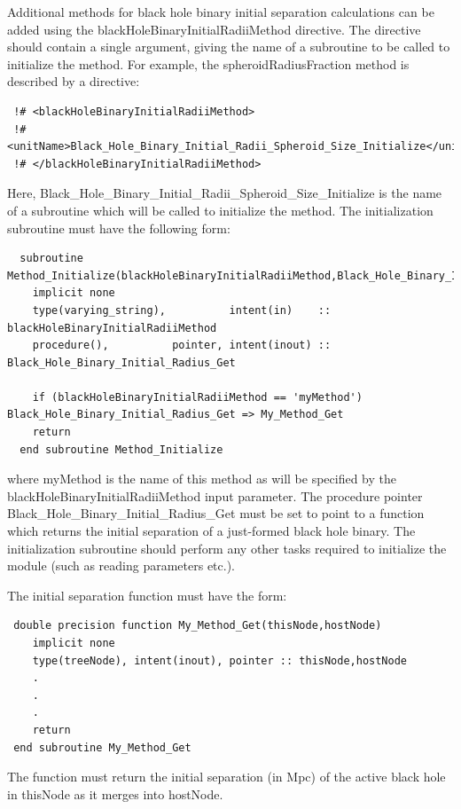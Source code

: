 Additional methods for black hole binary initial separation calculations can be added using the {\normalfont \ttfamily blackHoleBinaryInitialRadiiMethod} directive. The directive should contain a single argument, giving the name of a subroutine to be called to initialize the method. For example, the {\normalfont \ttfamily spheroidRadiusFraction} method is described by a directive:
\begin{verbatim}
 !# <blackHoleBinaryInitialRadiiMethod>
 !#  <unitName>Black_Hole_Binary_Initial_Radii_Spheroid_Size_Initialize</unitName>
 !# </blackHoleBinaryInitialRadiiMethod>
\end{verbatim}
Here, {\normalfont \ttfamily Black\_Hole\_Binary\_Initial\_Radii\_Spheroid\_Size\_Initialize} is the name of a subroutine which will be called to initialize the method. The initialization subroutine must have the following form:
\begin{verbatim}
  subroutine Method_Initialize(blackHoleBinaryInitialRadiiMethod,Black_Hole_Binary_Initial_Radius_Get)
    implicit none
    type(varying_string),          intent(in)    :: blackHoleBinaryInitialRadiiMethod
    procedure(),          pointer, intent(inout) :: Black_Hole_Binary_Initial_Radius_Get
    
    if (blackHoleBinaryInitialRadiiMethod == 'myMethod') Black_Hole_Binary_Initial_Radius_Get => My_Method_Get
    return
  end subroutine Method_Initialize
\end{verbatim}
where {\normalfont \ttfamily myMethod} is the name of this method as will be specified by the {\normalfont \ttfamily blackHoleBinaryInitialRadiiMethod} input parameter. The procedure pointer {\normalfont \ttfamily Black\_Hole\_Binary\_Initial\_Radius\_Get} must be set to point to a function which returns the initial separation of a just-formed black hole binary. The initialization subroutine should perform any other tasks required to initialize the module (such as reading parameters etc.).

The initial separation function must have the form:
\begin{verbatim}
 double precision function My_Method_Get(thisNode,hostNode)
    implicit none
    type(treeNode), intent(inout), pointer :: thisNode,hostNode
    .
    .
    .
    return
 end subroutine My_Method_Get
\end{verbatim}
The function must return the initial separation (in Mpc) of the active black hole in {\normalfont \ttfamily thisNode} as it merges into {\normalfont \ttfamily hostNode}.

